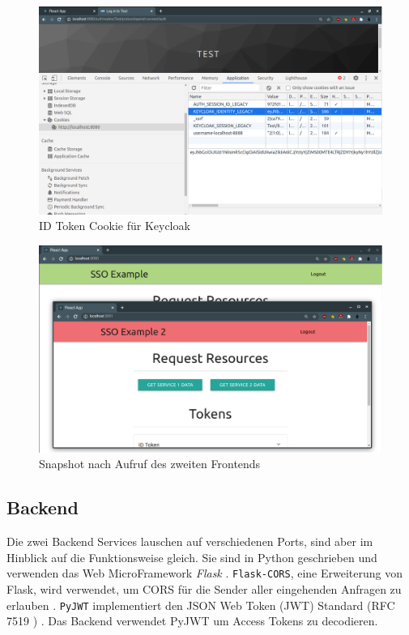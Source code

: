 \begin{figure}[!ht]
	\centering
	\includegraphics[width=1\textwidth]{Images/EbertScherer/FrontendCookieForKeycloak.PNG}
	\caption{ID Token Cookie für Keycloak}
	\label{fig:EB_ID Token Cookie für Keycloak}
\end{figure}

\begin{figure}[!ht]
	\centering
	\includegraphics[width=1\textwidth]{Images/EbertScherer/FrontendOpenSecondFrontend.PNG}
	\caption{Snapshot nach Aufruf des zweiten Frontends}
	\label{fig:EB_Snapshot nach Aufruf des zweiten Frontends}
\end{figure}


\subsection{Backend} \label{EB_Backend}

Die zwei Backend Services lauschen auf verschiedenen Ports, sind aber im Hinblick auf die Funktionsweise gleich. Sie sind in Python geschrieben und verwenden das Web MicroFramework \textit{Flask} \cite{EB48}. \texttt{Flask-CORS}, eine Erweiterung von Flask, wird verwendet, um CORS für die Sender aller eingehenden Anfragen zu erlauben \cite{EB49}. \texttt{PyJWT} implementiert den JSON Web Token (JWT) Standard (RFC 7519 \cite{SSEB_RFC7519}) \cite{EB51}. Das Backend verwendet PyJWT um Access Tokens zu decodieren.

